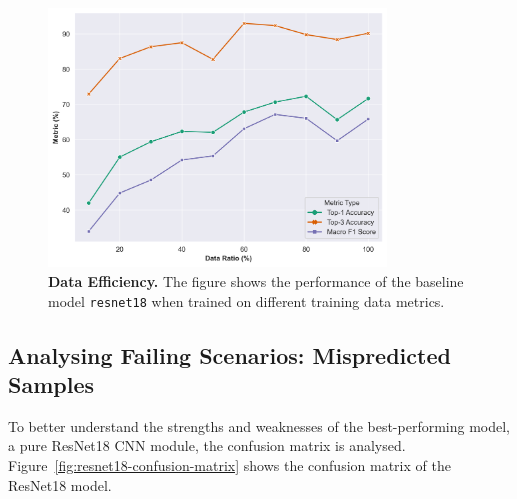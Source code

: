 \documentclass[a4paper]{article}
\begin{document}

  \begin{figure}[ht]
    \centering
    \includegraphics[width=0.8\textwidth]{./figures/experiment2-ratio-vs-performance.png}
    \caption{
      \textbf{Data Efficiency.} The figure shows the performance of the baseline
      model \texttt{resnet18} when trained on different training data metrics.
    }
    \label{fig:data-efficiency}
  \end{figure}
  
  

  
  
  
  \subsection{Analysing Failing Scenarios: Mispredicted Samples} %
  \label{sub:Analysing Failing Scenarios: Mispredicted Samples}

  To better understand the strengths and weaknesses of the best-performing
  model, a pure ResNet18 CNN module, the confusion matrix is analysed.
  Figure~\ref{fig:resnet18-confusion-matrix} shows the confusion matrix of the
  ResNet18 model.
\end{document}
